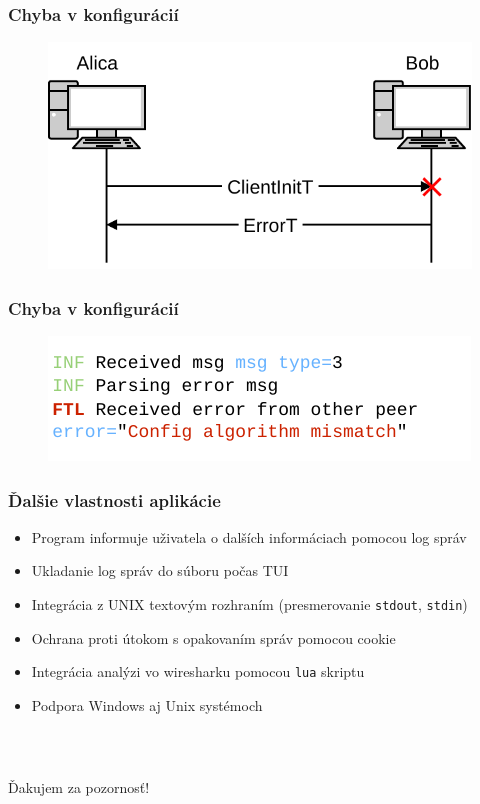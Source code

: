 \documentclass[%
  14pt,       				%
	t,                  %
	aspectratio=1610,   %
	unicode,						%
]{beamer}				    	%
\begin{document}
\begin{frame}[c]
	\frametitle{Chyba v konfigurácií}
	\begin{figure}
		\includegraphics[width=.9\textwidth]{presentation_pictures/comm_err.pdf}
	\end{figure}
\end{frame}

\begin{frame}[c]
	\frametitle{Chyba v konfigurácií}
	\begin{figure}[htbp]
		\centering
		\includegraphics[width=\textwidth]{presentation_pictures/client_err.pdf}
	\end{figure}
\end{frame}

\begin{frame}[c]
	\frametitle{Ďalšie vlastnosti aplikácie}
	\large{\begin{itemize}
			\item Program informuje uživatela o dalších informáciach pomocou log správ
			\item Ukladanie log správ do súboru počas TUI
			\item Integrácia z UNIX textovým rozhraním (presmerovanie \texttt{stdout}, \texttt{stdin})
			\item Ochrana proti útokom s opakovaním správ pomocou cookie
			\item Integrácia analýzi vo wiresharku pomocou \texttt{lua} skriptu
			\item Podpora Windows aj Unix systémoch
		\end{itemize}}
\end{frame}

\begin{frame}[c]
	\frametitle{\mbox{ }}
	\begin{center}
		{\Huge Ďakujem za pozornosť!}
	\end{center}
\end{frame}

\end{document}
